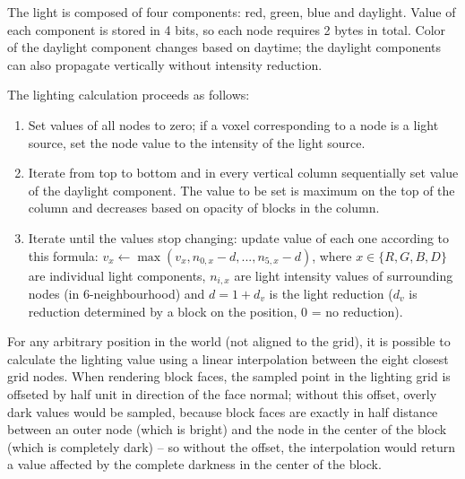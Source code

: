 The light is composed of four components: red, green, blue and daylight. Value of each component is stored in 4 bits, so each node requires 2 bytes in total. Color of the daylight component changes based on daytime; the daylight components can also propagate vertically without intensity reduction.

The lighting calculation proceeds as follows: \nopagebreak
\begin{enumerate}
	\item Set values of all nodes to zero; if a voxel corresponding to a node is a light source, set the node value to the intensity of the light source.
	\item Iterate from top to bottom and in every vertical column sequentially set value of the daylight component. The value to be set is maximum on the top of the column and decreases based on opacity of blocks in the column.
	\item Iterate until the values stop changing: update value of each one according to this formula: $v_x \leftarrow \max(v_x, n_{0,x} - d, ..., n_{5,x} - d)$, where $x \in \{R, G, B, D\}$ are individual light components, $n_{i, x}$ are light intensity values of surrounding nodes (in 6-neighbourhood) and $d = 1 + d_v$ is the light reduction ($d_v$ is reduction determined by a block on the position, 0 = no reduction).
\end{enumerate}

For any arbitrary position in the world (not aligned to the grid), it is possible to calculate the lighting value using a linear interpolation between the eight closest grid nodes. When rendering block faces, the sampled point in the lighting grid is offseted by half unit in direction of the face normal; without this offset, overly dark values would be sampled, because block faces are exactly in half distance between an outer node (which is bright) and the node in the center of the block (which is completely dark) -- so without the offset, the interpolation would return a value affected by the complete darkness in the center of the block.


